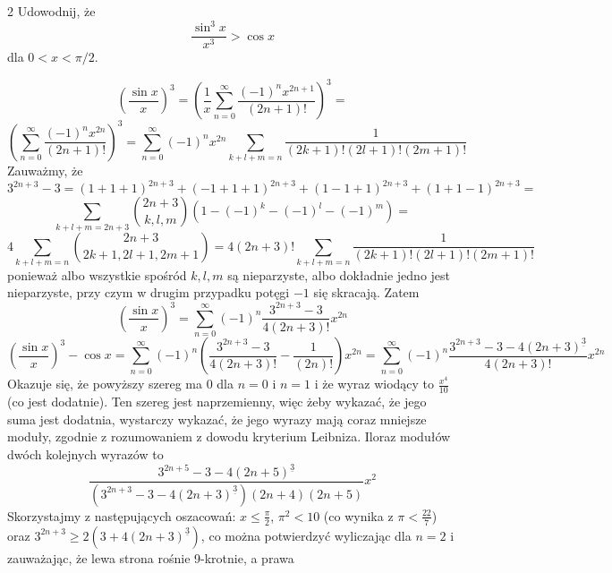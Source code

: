 \documentclass{../note}
\begin{document}
\begin{zadanie}{2}
Udowodnij, że
\[ \frac{\sin^3 x}{x^3} > \cos x \]
dla $0 < x < \pi/2$.
\end{zadanie}
\begin{rozwiazanie}
\[\left(\frac{\sin x}{x}\right)^3 = \left(\frac1x\sum_{n=0}^{\infty} \frac{(-1)^nx^{2n+1}}{(2n+1)!}\right)^3 =\]\[ \left(\sum_{n=0}^{\infty} \frac{(-1)^nx^{2n}}{(2n+1)!}\right)^3 = \sum_{n=0}^{\infty}(-1)^nx^{2n}\sum_{k+l+m=n} \frac{1}{(2k+1)!(2l+1)!(2m+1)!}\]
Zauważmy, że
\[3^{2n+3} - 3 = (1+1+1)^{2n+3} + (-1+1+1)^{2n+3} + (1-1+1)^{2n+3} + (1+1-1)^{2n+3} =\]
\[\sum_{k+l+m=2n+3}\binom{2n+3}{k, l, m} \left(1 - (-1)^k - (-1)^l - (-1)^m\right) =\]\[ 4\sum_{k+l+m=n} \binom{2n+3}{2k + 1, 2l + 1, 2m + 1} = 4(2n+3)!\sum_{k+l+m=n} \frac{1}{(2k + 1)!(2l + 1)!(2m + 1)!}\]
ponieważ albo wszystkie spośród $k, l, m$ są nieparzyste, albo dokładnie jedno jest nieparzyste, przy czym w drugim przypadku potęgi $-1$ się skracają. Zatem
\[\left(\frac{\sin x}{x}\right)^3 = \sum_{n=0}^{\infty}(-1)^n\frac{3^{2n+3} - 3}{4(2n+3)!} x^{2n}\]
\[\left(\frac{\sin x}{x}\right)^3 - \cos x = \sum_{n=0}^{\infty}(-1)^n\left(\frac{3^{2n+3} - 3}{4(2n+3)!} - \frac{1}{(2n)!}\right) x^{2n} = \sum_{n=0}^{\infty}(-1)^n\frac{3^{2n+3} - 3 - 4(2n+3)^{\underline{3}}}{4(2n+3)!} x^{2n}\]
Okazuje się, że powyższy szereg ma 0 dla $n=0$ i $n = 1$ i że wyraz wiodący to $\frac{x^4}{10}$ (co jest dodatnie). Ten szereg jest naprzemienny, więc żeby wykazać, że jego suma jest dodatnia, wystarczy wykazać, że jego wyrazy mają coraz mniejsze moduły, zgodnie z rozumowaniem z dowodu kryterium Leibniza. Iloraz modułów dwóch kolejnych wyrazów to
\[\frac{3^{2n+5} - 3 - 4(2n+5)^{\underline{3}}}{\left(3^{2n+3} - 3 - 4(2n+3)^{\underline{3}}\right)(2n+4)(2n+5)} x^2\]
Skorzystajmy z następujących oszacowań: $x \leq \frac{\pi}{2}$, $\pi^2 < 10$ (co wynika z $\pi < \frac{22}{7}$) oraz $3^{2n+3} \geq 2\left(3 + 4(2n+3)^{\underline{3}}\right)$, co można potwierdzyć wyliczając dla $n = 2$ i zauważając, że lewa strona rośnie 9-krotnie, a prawa 
\end{rozwiazanie}
\end{document}
